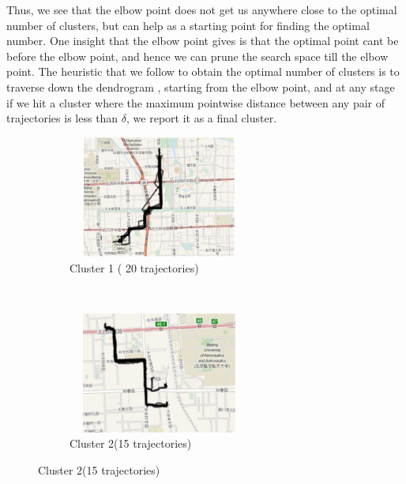 Thus, we see that the elbow point does not get us anywhere close to the optimal number of clusters, but can help as a starting point for finding the optimal number. One insight that the elbow point gives is that the optimal point cant be before the elbow point, and hence we can prune the search space till the elbow point. 
The heuristic that we follow to obtain the optimal number of clusters is to traverse down the dendrogram , starting from the elbow point, and at any stage if we hit a cluster where the maximum pointwise distance between any pair of trajectories is less than $\delta$, we report it as a final cluster. 
\begin{figure}
    \centering
    \begin{subfigure}[t]{.5\textwidth}
        \centering
        \includegraphics[width=6cm,height=4cm,keepaspectratio]{figs/new/FinalCluster1.eps}
        \caption{Cluster 1 ( 20 trajectories)}
    \end{subfigure}%
    ~ 
    \begin{subfigure}[t]{.5\textwidth}
        \centering
        \includegraphics[width=6cm,height=4cm,keepaspectratio]{figs/new/FinalCluster2.eps}
        \caption{Cluster 2(15 trajectories)}
    \end{subfigure}
    

\end{figure}

